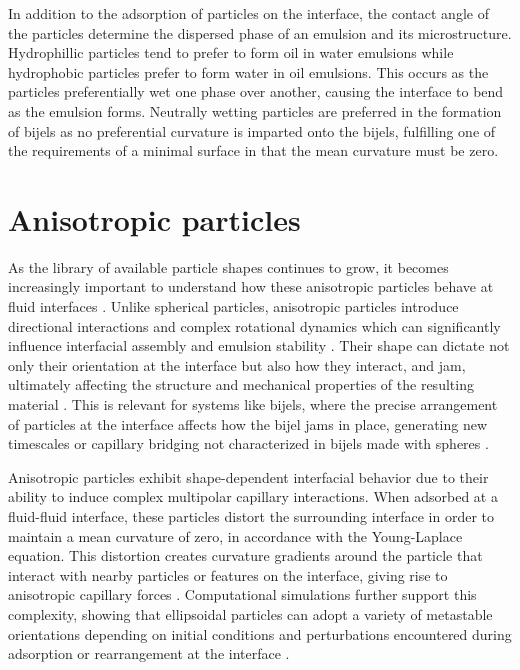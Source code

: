 In addition to the adsorption of particles on the interface, the contact angle of the particles determine the dispersed phase of an emulsion and its microstructure. \cite{velankar_non-equilibrium_2015}
Hydrophillic particles tend to prefer to form oil in water emulsions while hydrophobic particles prefer to form water in oil emulsions. \cite{ngai_particle-stabilized_2015}
This occurs as the particles preferentially wet one phase over another, causing the interface to bend as the emulsion forms. Neutrally wetting particles are preferred in the formation of 
bijels as no preferential curvature is imparted onto the bijels, fulfilling one of the requirements of a minimal surface in that the mean curvature must be zero. \cite{jinnai_interfacial_2001}

\section{Anisotropic particles}

As the library of available particle shapes continues to grow, it becomes increasingly important to understand how these anisotropic particles behave at fluid interfaces
\cite{wu_recent_2016, cavallaro_curvature-driven_2011}.
Unlike spherical particles, anisotropic particles introduce directional interactions and complex rotational dynamics which can significantly 
influence interfacial assembly and emulsion stability \cite{read_dimerization_2020, davies_dipolar_2015,morgan_understanding_2013}. 
Their shape can dictate not only their orientation at the interface but also how they interact, and jam, 
ultimately affecting the structure and mechanical properties of the resulting material \cite{hijnen_bijels_2015}.
This is relevant for systems like bijels, where the precise arrangement of particles at the interface affects how the bijel jams in place, generating new timescales or 
capillary bridging not characterized in bijels made with spheres \cite{gunther_timescales_2014,hijnen_bijels_2015,witt_bijel_2013}.

Anisotropic particles exhibit shape-dependent interfacial behavior due to their ability to induce complex multipolar capillary interactions. When adsorbed at a fluid-fluid interface, these 
particles distort the surrounding interface in order to maintain a mean curvature of zero, in accordance with the Young-Laplace equation. This distortion creates curvature gradients around the 
particle that interact with nearby particles or features on the interface, giving rise to anisotropic capillary forces \cite{loudet_capillary_2005, cheng_shape-anisotropic_2013}. 
Computational simulations further support this complexity, showing that ellipsoidal particles can adopt a variety of metastable orientations 
depending on initial conditions and perturbations encountered during adsorption or rearrangement at the interface \cite{gunther_lattice_2013, newton_influence_2014}. 


